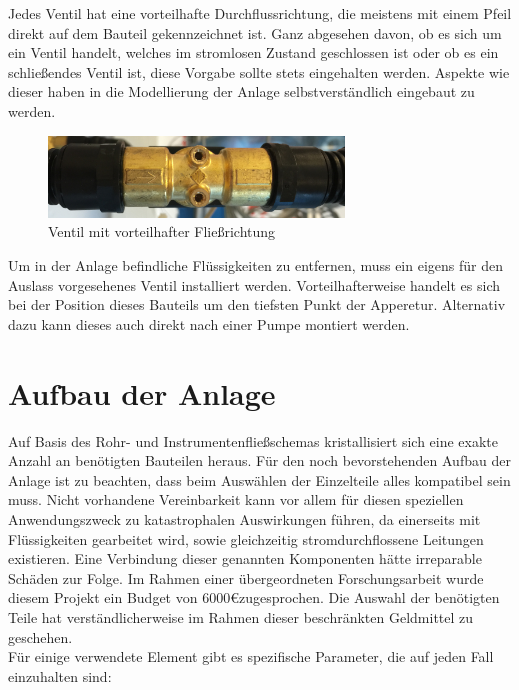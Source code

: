Jedes Ventil hat eine vorteilhafte Durchflussrichtung, die meistens mit einem Pfeil direkt auf dem Bauteil gekennzeichnet ist. Ganz abgesehen davon, ob es sich um ein Ventil handelt, welches im stromlosen Zustand geschlossen ist oder ob es ein schließendes Ventil ist, diese Vorgabe sollte stets eingehalten werden. Aspekte wie dieser haben in die Modellierung der Anlage selbstverständlich eingebaut zu werden.\\

\begin{figure}[h!]
  \centering
  \includegraphics[width=0.7\textwidth]{graphics/implementation/Fliessrichtung.jpg}
  \caption{Ventil mit vorteilhafter Fließrichtung}
\end{figure}

Um in der Anlage befindliche Flüssigkeiten zu entfernen, muss ein eigens für den Auslass vorgesehenes Ventil installiert werden. Vorteilhafterweise handelt es sich bei der Position dieses Bauteils um den tiefsten Punkt der Apperetur. Alternativ dazu kann dieses auch direkt nach einer Pumpe montiert werden.

\section{Aufbau der Anlage}
Auf Basis des Rohr- und Instrumentenfließschemas kristallisiert sich eine exakte Anzahl an benötigten Bauteilen heraus. Für den noch bevorstehenden Aufbau der Anlage ist zu beachten, dass beim Auswählen der Einzelteile alles kompatibel sein muss. Nicht vorhandene Vereinbarkeit kann vor allem für diesen speziellen Anwendungszweck zu katastrophalen Auswirkungen führen, da einerseits mit Flüssigkeiten gearbeitet wird, sowie gleichzeitig stromdurchflossene Leitungen existieren. Eine Verbindung dieser genannten Komponenten hätte irreparable Schäden zur Folge. Im Rahmen einer übergeordneten Forschungsarbeit wurde diesem Projekt ein Budget von 6000\euro \space zugesprochen. Die Auswahl der benötigten Teile hat verständlicherweise im Rahmen dieser beschränkten Geldmittel zu geschehen.\\
	
	Für einige verwendete Element gibt es spezifische Parameter, die auf jeden Fall einzuhalten sind:\\
	
